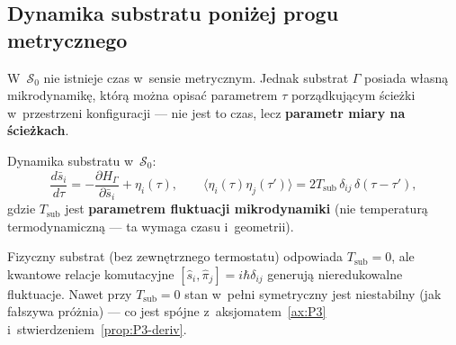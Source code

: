 \subsection{Dynamika substratu poni\.zej progu
  metrycznego}\label{ssec:S0-dyn}

W~$\mathcal{S}_0$ nie istnieje czas w~sensie metrycznym. Jednak
substrat $\Gamma$ posiada w\l{}asn\k{a} mikrodynamik\k{e}, kt\'or\k{a}
mo\.zna opisa\'c parametrem $\tau$ porz\k{a}dkuj\k{a}cym
\'scie\.zki w~przestrzeni konfiguracji --- nie jest to czas,
lecz \textbf{parametr miary na \'scie\.zkach}.

\begin{definition}\label{def:relax}
Dynamika substratu w~$\mathcal{S}_0$:
\begin{equation}\label{eq:relax}
    \frac{d\bar{s}_i}{d\tau}
    = -\frac{\partial H_\Gamma}{\partial \bar{s}_i}
    + \eta_i(\tau),
    \qquad
    \langle\eta_i(\tau)\eta_j(\tau')\rangle
    = 2T_{\mathrm{sub}}\,\delta_{ij}\,\delta(\tau-\tau'),
\end{equation}
gdzie $T_{\mathrm{sub}}$ jest \textbf{parametrem
fluktuacji mikrodynamiki} (nie temperatur\k{a}
termodynamiczn\k{a} --- ta wymaga czasu i~geometrii).
\end{definition}

\begin{remark}
Fizyczny substrat (bez zewn\k{e}trznego termostatu)
odpowiada $T_{\mathrm{sub}} = 0$, ale kwantowe
relacje komutacyjne
$[\hat{s}_i, \hat{\pi}_j] = i\hbar\delta_{ij}$
generuj\k{a} nieredukowalne fluktuacje. Nawet przy
$T_{\mathrm{sub}} = 0$ stan w~pe\l{}ni symetryczny
jest niestabilny (jak fa\l{}szywa pr\'o\.znia) ---
co jest sp\'ojne z~aksjomatem~\ref{ax:P3}
i~stwierdzeniem~\ref{prop:P3-deriv}.
\end{remark}


